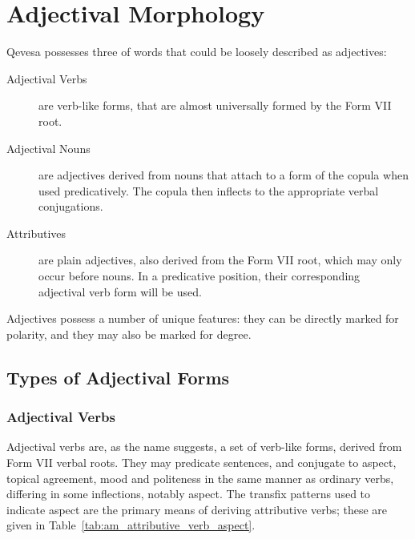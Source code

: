 \documentclass[grammar]{subfiles}
\begin{document}
	\chapter{Adjectival Morphology}
	\label{ch:adjectival-morphology}

	Qevesa possesses three of words that could be loosely described as adjectives:
	
	\begin{description}
		\item[Adjectival Verbs] are verb-like forms, that are almost universally formed by the Form VII root.
		\item[Adjectival Nouns] are adjectives derived from nouns that attach to a form of the copula when used predicatively. The copula then inflects to the appropriate verbal conjugations.
		\item[Attributives] are plain adjectives, also derived from the Form VII root, which may only occur before nouns. In a predicative position, their corresponding adjectival verb form will be used.
		\end{description}
	
	Adjectives possess a number of unique features: they can be directly marked for polarity, and they may also be marked for degree.

	\section{Types of Adjectival Forms}
	\label{sec:am_adjectival_forms}

	\subsection{Adjectival Verbs}
	\label{ssec:am_adjectival_verbs}

	Adjectival verbs are, as the name suggests, a set of verb-like forms, derived from Form VII verbal roots. They may predicate sentences, and conjugate to aspect, topical agreement, mood and politeness in the same manner as ordinary verbs, differing in some inflections, notably aspect. The transfix patterns used to indicate aspect are the primary means of deriving attributive verbs; these are given in Table~\ref{tab:am_attributive_verb_aspect}.
\end{document}
